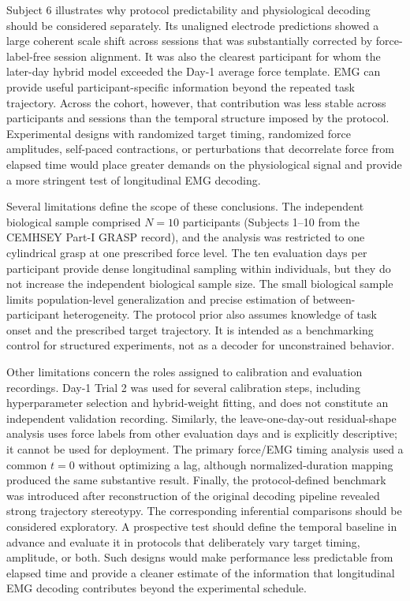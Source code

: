 \documentclass[preprint,12pt]{elsarticle}
\begin{document}
Subject 6 illustrates why protocol predictability and physiological decoding should be considered separately. Its unaligned electrode predictions showed a large coherent scale shift across sessions that was substantially corrected by force-label-free session alignment. It was also the clearest participant for whom the later-day hybrid model exceeded the Day-1 average force template. EMG can provide useful participant-specific information beyond the repeated task trajectory. Across the cohort, however, that contribution was less stable across participants and sessions than the temporal structure imposed by the protocol. Experimental designs with randomized target timing, randomized force amplitudes, self-paced contractions, or perturbations that decorrelate force from elapsed time would place greater demands on the physiological signal and provide a more stringent test of longitudinal EMG decoding.

Several limitations define the scope of these conclusions. The independent biological sample comprised $N=10$ participants (Subjects 1--10 from the CEMHSEY Part-I GRASP record), and the analysis was restricted to one cylindrical grasp at one prescribed force level. The ten evaluation days per participant provide dense longitudinal sampling within individuals, but they do not increase the independent biological sample size. The small biological sample limits population-level generalization and precise estimation of between-participant heterogeneity. The protocol prior also assumes knowledge of task onset and the prescribed target trajectory. It is intended as a benchmarking control for structured experiments, not as a decoder for unconstrained behavior.

Other limitations concern the roles assigned to calibration and evaluation recordings. Day-1 Trial 2 was used for several calibration steps, including hyperparameter selection and hybrid-weight fitting, and does not constitute an independent validation recording. Similarly, the leave-one-day-out residual-shape analysis uses force labels from other evaluation days and is explicitly descriptive; it cannot be used for deployment. The primary force/EMG timing analysis used a common $t=0$ without optimizing a lag, although normalized-duration mapping produced the same substantive result. Finally, the protocol-defined benchmark was introduced after reconstruction of the original decoding pipeline revealed strong trajectory stereotypy. The corresponding inferential comparisons should be considered exploratory. A prospective test should define the temporal baseline in advance and evaluate it in protocols that deliberately vary target timing, amplitude, or both. Such designs would make performance less predictable from elapsed time and provide a cleaner estimate of the information that longitudinal EMG decoding contributes beyond the experimental schedule.
\end{document}
